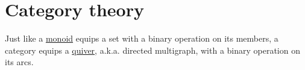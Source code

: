 \section{Category theory}\label{sec:category_theory}

Just like a \hyperref[def:monoid]{monoid} equips a set with a binary operation on its members, a category equips a \hyperref[def:graph/quiver]{quiver}, a.k.a. directed multigraph, with a binary operation on its arcs.
